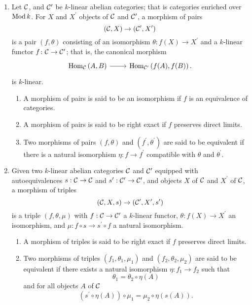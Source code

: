 \documentclass[dissertation.tex]{subfiles}
\begin{document}
\begin{defn}
  \begin{enumerate}
  \item
    Let $\mathcal{C}$, and $\mathcal{C}^\prime$ be $k$-linear abelian categories; that is categories enriched over $\operatorname{Mod}k$.
    For $X$ and $X^\prime$ objects of $\mathcal{C}$ and $\mathcal{C}^\prime$, a morphism of pairs
    $$(\mathcal{C}, X) \rightarrow (\mathcal{C}^\prime, X^\prime)$$
    is a pair $(f, \theta)$ consisting of an isomorphism $\theta \colon f(X) \rightarrow X^\prime$ and a $k$-linear functor $f \colon \mathcal{C} \rightarrow \mathcal{C}^\prime$; that is, the canonical morphism
    $$\begin{tikzcd}
      \Hom{\C}{A,B}\arrow{r}& \Hom{\C^\prime}{f(A), f(B)}.
    \end{tikzcd}$$
    is $k$-linear.
    \begin{enumerate}
    \item
      A morphism of pairs is said to be an isomorphism if $f$ is an equivalence of categories.
    \item
      A morphism of pairs is said to be right exact if $f$ preserves direct limits.
    \item
      Two morphisms of pairs $(f,\theta)$ and $(f^\prime, \theta^\prime)$ are said to be equivalent if there is a natural isomorphism $\eta \colon f \rightarrow f^\prime$ compatible with $\theta$ and $\theta^\prime$.
    \end{enumerate}
  \item
    Given two $k$-linear abelian categories $\mathcal{C}$ and $\mathcal{C}^\prime$ equipped with autoequivalences $s : \mathcal{C} \rightarrow \mathcal{C}$ and $s^\prime : \mathcal{C}^\prime \rightarrow \mathcal{C}^\prime$, and objects $X$ of $\mathcal{C}$ and $X^\prime$ of $\mathcal{C}$, a morphism of triples
    $$(\mathcal{C}, X, s) \rightarrow (\mathcal{C}^\prime, X^\prime, s^\prime)$$
    is a triple $(f, \theta, \mu)$ with $f : \mathcal{C} \rightarrow \mathcal{C}^\prime$ a $k$-linear functor, $\theta : f(X) \rightarrow X^\prime$ an isomorphism, and $\mu : f \circ s \rightarrow s^\prime \circ f$ a natural isomorphism.
    \begin{enumerate}
    \item
      A morphism of triples is said to be right exact if $f$ preserves direct limits.
    \item
      Two morphisms of triples $(f_1, \theta_1, \mu_1)$ and $(f_2, \theta_2, \mu_2)$ are said to be equivalent if there exists a natural isomorphism $\eta : f_1 \rightarrow f_2$ such that
      $$\theta_1 = \theta_2 \circ \eta(A)$$
      and for all objects $A$ of $\mathcal{C}$
      $$(s^\prime \circ \eta(A)) \circ \mu_1 = \mu_2 \circ \eta(s(A)).$$

\end{enumerate}
\end{enumerate}
\end{defn}
\end{document}
